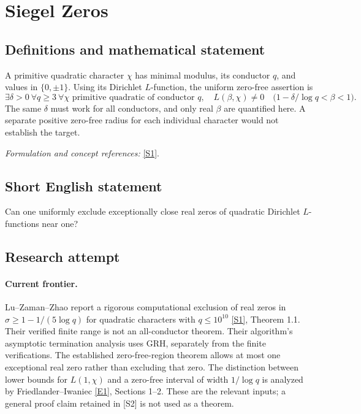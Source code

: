 \documentclass[11pt,a4paper]{article}
\newcommand{\sref}[2]{\hyperlink{source:#1:#2}{[S#2]}}
\newcommand{\eref}[2]{\hyperlink{extra:#1:#2}{[E#2]}}
\newif\ifshowcatalogue
\newcommand{\cataloguescope}[1]{\ifshowcatalogue
 \paragraph{Exact scope in the supplied catalogue.}
 \begin{quote}\small #1\end{quote}\fi}
\numberwithin{equation}{section}
\begin{document}
\setcounter{section}{0}
\clearpage
\section*{\texorpdfstring{Siegel Zeros}{Siegel Zeros}}\label{statement}
\subsection{Definitions and mathematical statement}
A primitive quadratic character $\chi$ has minimal modulus, its conductor $q$, and values in $\{0,\pm1\}$. Using its Dirichlet $L$-function, the uniform zero-free assertion is
\[
 \exists\delta>0\ \forall q\ge3\ \forall\chi\text{ primitive quadratic of conductor }q,
 \quad L(\beta,\chi)\ne0\quad\bigl(1-\delta/\log q<\beta<1\bigr).
\]
The same $\delta$ must work for all conductors, and only real $\beta$ are quantified here. A separate positive zero-free radius for each individual character would not establish the target.
\par\smallskip\textit{Formulation and concept references:} \sref{statement}{1}.
\cataloguescope{Does there exist an absolute constant \ensuremath{\delta}>0 such that, for every primitive quadratic Dirichlet character \ensuremath{\chi} of conductor q\ensuremath{\ge}3, L(\ensuremath{\beta},\ensuremath{\chi})\ensuremath{\ne}0 for every real \ensuremath{\beta} with 1\ensuremath{-}\ensuremath{\delta}/log q<\ensuremath{\beta}<1? The logarithm is natural and the same \ensuremath{\delta} must work for all conductors.}
\subsection{Short English statement}
Can one uniformly exclude exceptionally close real zeros of quadratic Dirichlet $L$-functions near one?
\subsection{Research attempt}
\paragraph{Current frontier.}
Lu--Zaman--Zhao report a rigorous computational exclusion of real zeros in
$\sigma\ge1-1/(5\log q)$ for quadratic characters with $q\le10^{10}$
\sref{statement}{1}, Theorem 1.1. Their verified finite range is not an
all-conductor theorem. Their algorithm's asymptotic termination analysis
uses GRH, separately from the finite verifications. The established
zero-free-region theorem allows at most one exceptional real zero rather
than excluding that zero. The distinction between lower bounds for
$L(1,\chi)$ and a zero-free interval of width $1/\log q$ is analyzed by
Friedlander--Iwaniec \eref{statement}{1}, Sections 1--2. These are the relevant
inputs; a general proof claim retained in [S2] is not used as a theorem.
\end{document}
